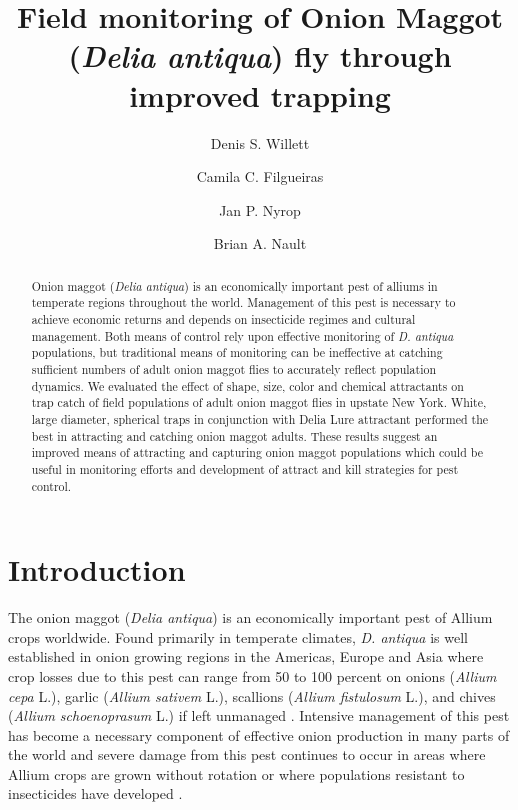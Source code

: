 \documentclass[alpha-refs]{wiley-article}
\title{Field monitoring of Onion Maggot (\textit{Delia antiqua}) fly through improved trapping}
\author[1\authfn{1}]{Denis S. Willett}
\author[1\authfn{1}]{Camila C. Filgueiras}
\author[1]{Jan P. Nyrop}
\author[1]{Brian A. Nault}
\affil[1]{Department of Entomology, Cornell AgriTech, Cornell University, Geneva, NY, 14456, USA}
\begin{document}
\maketitle

\begin{abstract}
Onion maggot (\textit{Delia antiqua}) is an economically important pest of alliums in temperate regions throughout the world.  Management of this pest is necessary to achieve economic returns and depends on insecticide regimes and cultural management.  Both means of control rely upon effective monitoring of \textit{D. antiqua} populations, but traditional means of monitoring can be ineffective at catching sufficient numbers of adult onion maggot flies to accurately reflect population dynamics.  We evaluated the effect of shape, size, color and chemical attractants on trap catch of field populations of adult onion maggot flies in upstate New York.  White, large diameter, spherical traps in conjunction with Delia Lure attractant performed the best in attracting and catching onion maggot adults.  These results suggest an improved means of attracting and capturing onion maggot populations which could be useful in monitoring efforts and development of attract and kill strategies for pest control. 

\end{abstract}

\linenumbers
\section{Introduction}

The onion maggot (\textit{Delia antiqua}) is an economically important pest of Allium crops worldwide.  Found primarily in temperate climates, \textit{D. antiqua} is well established in onion growing regions in the Americas, Europe and Asia where crop losses due to this pest can range from 50 to 100 percent on onions (\textit{Allium cepa} L.), garlic (\textit{Allium sativem} L.), scallions (\textit{Allium fistulosum} L.), and chives (\textit{Allium schoenoprasum} L.) if left unmanaged \citep{ellis1979factors,ning2017predicting,nault2007ecology, nault2006performance, nault2006onion}.  Intensive management of this pest has become a necessary component of effective onion production in many parts of the world and severe damage from this pest continues to occur in areas where Allium crops are grown without rotation or where populations resistant to insecticides have developed \citep{martinson1988dispersal, nault2006onion}.  
\end{document}
